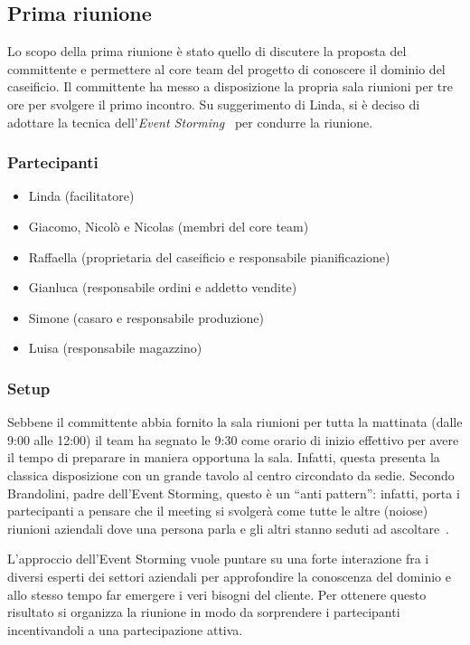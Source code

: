 \subsection{Prima riunione}
\label{sec:prima-riunione}
Lo scopo della prima riunione è stato quello di discutere la proposta del committente e permettere al core team del progetto di conoscere il dominio del caseificio. Il committente ha messo a disposizione la propria sala riunioni per tre ore per svolgere il primo incontro. 
Su suggerimento di Linda, si è deciso di adottare la tecnica dell'\emph{Event Storming}~\cite{cit:event-storming} per condurre la riunione. 

\subsubsection{Partecipanti}
\label{sec:prima-riunione-partecipanti}
\begin{itemize}
\item Linda (facilitatore)
\item Giacomo, Nicolò e Nicolas (membri del core team)
\item Raffaella (proprietaria del caseificio e responsabile pianificazione)
\item Gianluca (responsabile ordini e addetto vendite)
\item Simone (casaro e responsabile produzione)
\item Luisa (responsabile magazzino)
\end{itemize}

\subsubsection{Setup}
\label{sec:prima-riunione-setup}
Sebbene il committente abbia fornito la sala riunioni per tutta la mattinata (dalle 9:00 alle 12:00) il team ha segnato le 9:30 come orario di inizio effettivo per avere il tempo di preparare in maniera opportuna la sala.
Infatti, questa presenta la classica disposizione con un grande tavolo al centro circondato da sedie. Secondo Brandolini, padre dell'Event Storming, questo è un ``anti pattern'': infatti, porta i partecipanti a pensare che il meeting si svolgerà come tutte le altre (noiose) riunioni aziendali dove una persona parla e gli altri stanno seduti ad ascoltare~\cite[pp.~116-118]{cit:event-storming-book}.

L'approccio dell'Event Storming vuole puntare su una forte interazione fra i diversi esperti dei settori aziendali per approfondire la conoscenza del dominio e allo stesso tempo far emergere i veri bisogni del cliente. Per ottenere questo risultato si organizza la riunione in modo da sorprendere i partecipanti incentivandoli a una partecipazione attiva.


